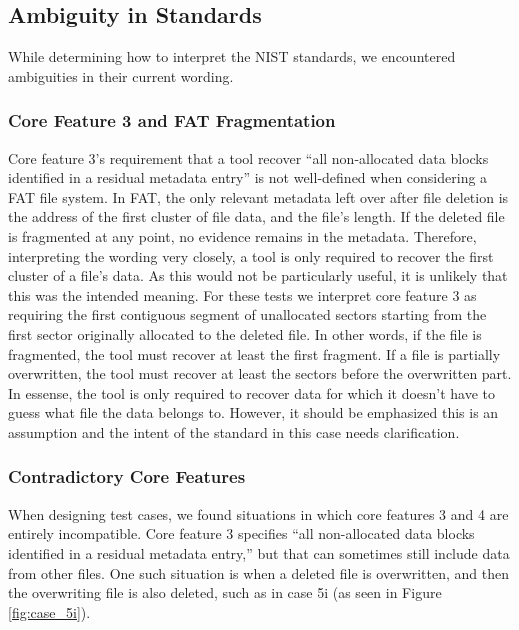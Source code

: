 \subsection{Ambiguity in Standards}
While determining how to interpret the NIST standards, we encountered ambiguities in their current wording.

\subsubsection{Core Feature 3 and FAT Fragmentation}
Core feature 3's requirement that a tool recover ``all non-allocated data blocks identified in a residual metadata entry''\cite{meta:dfr:standards} is not well-defined when considering a FAT file system. 
In FAT, the only relevant metadata left over after file deletion is the address of the first cluster of file data, and the file's length. 
If the deleted file is fragmented at any point, no evidence remains in the metadata. 
Therefore, interpreting the wording very closely, a tool is only required to recover the first cluster of a file's data. 
As this would not be particularly useful, it is unlikely that this was the intended meaning. 
For these tests we interpret core feature 3 as requiring the first contiguous segment of unallocated sectors starting from the first sector originally allocated to the deleted file. 
In other words, if the file is fragmented, the tool must recover at least the first fragment. 
If a file is partially overwritten, the tool must recover at least the sectors before the overwritten part.
In essense, the tool is only required to recover data for which it doesn't have to guess what file the data belongs to.
However, it should be emphasized this is an assumption and the intent of the standard in this case needs clarification.

\subsubsection{Contradictory Core Features}
When designing test cases, we found situations in which core features 3 and 4 are entirely incompatible. 
Core feature 3 specifies ``all non-allocated data blocks identified in a residual metadata entry,''\cite{meta:dfr:standards} but that can sometimes still include data from other files. 
One such situation is when a deleted file is overwritten, and then the overwriting file is also deleted, such as in case 5i (as seen in Figure \ref{fig:case_5i}).

